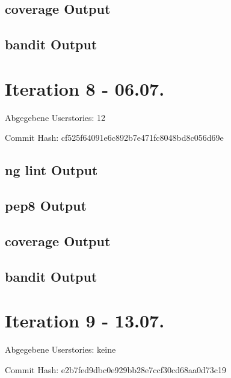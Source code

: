 \documentclass[accentcolor=tud0b,12pt,paper=a4]{tudreport}
\begin{document}
	\subsection*{coverage Output}
	
	
	\subsection*{bandit Output}
	

\section*{Iteration 8 - 06.07.}
	Abgegebene Userstories: 12
	
	Commit Hash: cf525f64091e6c892b7e471fc8048bd8c056d69e
	
	\subsection*{ng lint Output}
	
	
	\subsection*{pep8 Output}
	
	
	\subsection*{coverage Output}
%	
	
	\subsection*{bandit Output}
	





\section*{Iteration 9 - 13.07.}
	Abgegebene Userstories: keine
	
	Commit Hash: e2b7fed9dbc0e929bb28e7ccf30cd68aa0d73c19
	
\end{document}
